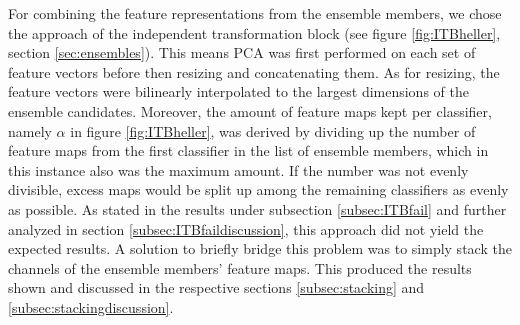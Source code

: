 For combining the feature representations from the ensemble members, we chose the approach of the independent transformation block (see figure \ref{fig:ITBheller}, section \ref{sec:ensembles}). This means 
PCA was first performed on each set of feature vectors before then resizing and concatenating them. As for resizing, 
the feature vectors were bilinearly interpolated to the largest dimensions of the ensemble candidates. Moreover, the amount of feature maps kept per classifier, namely $\alpha$ in figure \ref{fig:ITBheller}, 
was derived by dividing up the number of feature maps from the first classifier in the list of ensemble members, which in this instance also was the maximum amount. If the number 
was not evenly divisible, excess maps would be split up among the remaining classifiers as evenly as possible.\newline
As stated in the results under subsection \ref{subsec:ITBfail} and further analyzed in section \ref{subsec:ITBfaildiscussion}, this approach did not yield the expected results. 
A solution to briefly bridge this problem was to simply stack the channels of the ensemble members' feature maps. This produced the results shown and discussed in the respective 
sections \ref{subsec:stacking} and \ref{subsec:stackingdiscussion}.


